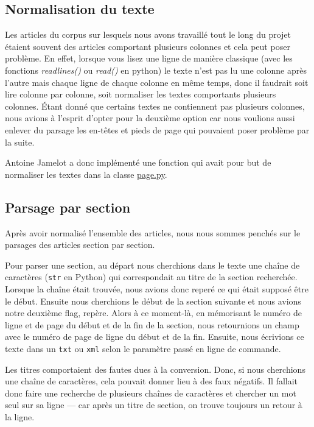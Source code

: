 \documentclass{article}
\begin{document}
\subsection{Normalisation du texte}
Les articles du corpus sur lesquels nous avons travaillé tout le long du projet étaient souvent des articles comportant plusieurs colonnes et cela peut poser problème. En effet, lorsque vous lisez une ligne de manière classique (avec les fonctions \textit{readlines()} ou \textit{read()} en python) le texte n'est pas lu une colonne après l'autre mais chaque ligne de chaque colonne en même temps, donc il faudrait soit lire colonne par colonne, soit normaliser les textes comportants plusieurs colonnes. Étant donné que certains textes ne contiennent pas plusieurs colonnes, nous avions à l'esprit d'opter pour la deuxième option car nous voulions aussi enlever du parsage les en-têtes et pieds de page qui pouvaient poser problème par la suite.

Antoine Jamelot a donc implémenté une fonction qui avait pour but de normaliser les textes dans la classe \textcolor{blue}{\href{https://github.com/TheauH/Parser-IRISA/blob/sprint5/parser_irisa/page.py}{page.py}}.


\subsection{Parsage par section}
Après avoir normalisé l'ensemble des articles, nous nous sommes penchés sur le parsages des articles section par section.

Pour parser une section, au départ nous cherchions dans le texte une chaîne de caractères (\texttt{str} en Python) qui correspondait au titre de la section recherchée. Lorsque la chaîne était trouvée, nous avions donc reperé ce qui était supposé être le début. Ensuite nous cherchions le début de la section suivante et nous avions notre deuxième \og flag\fg, repère. Alors à ce moment-là, en mémorisant le numéro de ligne et de page du début et de la fin de la section, nous retournions un champ avec le numéro de page de ligne du début et de la fin. Ensuite, nous écrivions ce texte dans un \texttt{txt} ou \texttt{xml} selon le paramètre passé en ligne de commande.

Les titres comportaient des fautes dues à la conversion. Donc, si nous cherchions une chaîne de caractères, cela pouvait donner lieu à des faux négatifs. Il fallait donc faire une recherche de plusieurs chaînes de caractères et chercher un mot seul sur sa ligne --- car après un titre de section, on trouve toujours un retour à la ligne.
\end{document}
